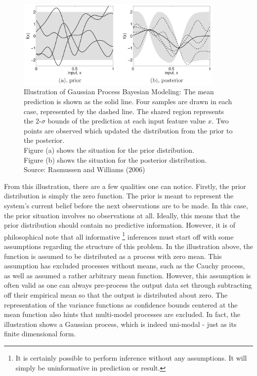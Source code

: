 		\begin{figure}[!htbp]
			\centering
				\includegraphics[width=0.9\textwidth]{Figures/bayesianmodeling.png}
			\caption{Illustration of Gaussian Process Bayesian Modeling: The mean prediction is shown as the solid line. Four samples are drawn in each case, represented by the dashed line. The shared region represents the 2-$\sigma$ bounds of the prediction at each input feature value $x$. Two points are observed which updated the distribution from the prior to the posterior.\\
			Figure (a) shows the situation for the prior distribution.\\
			Figure (b) shows the situation for the posterior distribution. \\
			Source: Rasmussen and Williams (2006) \cite{GaussianProcessForMachineLearning}}
			\label{Background:OceanEnvironmentModeling:Figure:bayesianmodeling}
		\end{figure}
		
		From this illustration, there are a few qualities one can notice. Firstly, the prior distribution is simply the zero function. The prior is meant to represent the system's current belief before the next observations are to be made. In this case, the prior situation involves no observations at all. Ideally, this means that the prior distribution should contain no predictive information. However, it is of philosophical note that all informative \footnote{It is certainly possible to perform inference without any assumptions. It will simply be uninformative in prediction or result.} inferences must start off with some assumptions regarding the structure of this problem. In the illustration above, the function is assumed to be distributed as a process with zero mean. This assumption has excluded processes without means, such as the Cauchy process, as well as assumed a rather arbitrary mean function. However, this assumption is often valid as one can always pre-process the output data set through subtracting off their empirical mean so that the output is distributed about zero. The representation of the variance functions as confidence bounds centered at the mean function also hints that multi-model processes are excluded. In fact, the illustration shows a Gaussian process, which is indeed uni-modal - just as its finite dimensional form.
		
